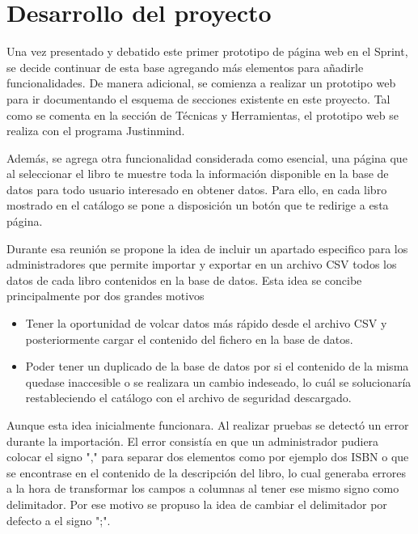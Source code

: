 \section{Desarrollo del proyecto}

Una vez presentado y debatido este primer prototipo de página web en el Sprint, se decide continuar de esta base agregando más elementos para añadirle funcionalidades. De manera adicional, se comienza a realizar un prototipo web para ir documentando el esquema de secciones existente en este proyecto. Tal como se comenta en la sección de Técnicas y Herramientas,  el prototipo web se realiza con el programa Justinmind.

Además, se agrega otra funcionalidad considerada como esencial, una página que al seleccionar el libro te muestre toda la información disponible en la base de datos para todo usuario interesado en obtener datos.
Para ello, en cada libro mostrado en el catálogo se pone a disposición un botón que te redirige a esta página.

Durante esa reunión se propone la idea de incluir un apartado especifico para los administradores que permite importar y exportar en un archivo CSV todos los datos de cada libro contenidos en la base de datos. 
Esta idea se concibe principalmente por dos grandes motivos
\begin{itemize}
    \item Tener la oportunidad de volcar datos más rápido desde el archivo CSV y posteriormente cargar el contenido del fichero en la base de datos.
    \item Poder tener un duplicado de la base de datos por si el contenido de la misma quedase inaccesible o se realizara un cambio indeseado, lo cuál se solucionaría restableciendo el catálogo con el archivo de seguridad descargado.

\end{itemize}
Aunque esta idea inicialmente funcionara. Al realizar pruebas se detectó un error durante la importación.
El error consistía en que un administrador pudiera colocar el signo "," para separar dos elementos como por ejemplo dos ISBN o que se encontrase en el contenido de la descripción del libro, lo cual generaba errores a la hora de transformar los campos a columnas al tener ese mismo signo como delimitador. Por ese motivo se propuso la idea de cambiar el delimitador por defecto a el signo ";".

